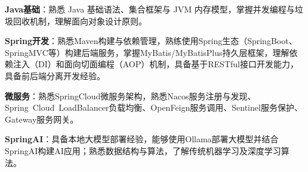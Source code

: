 \item \textbf{Java基础}：熟悉 Java 基础语法、集合框架与 JVM 内存模型，掌握并发编程与垃圾回收机制，理解面向对象设计原则。
\item \textbf{Spring开发}：熟悉Maven构建与依赖管理，熟练使用Spring生态（SpringBoot、SpringMVC等）构建后端服务，掌握MyBatis/MyBatisPlus持久层框架，理解依赖注入（DI）和面向切面编程（AOP）机制，具备基于RESTful接口开发能力，具备前后端分离开发经验。
\item \textbf{微服务}：熟悉SpringCloud微服务架构，熟悉Nacos服务注册与发现、Spring Cloud LoadBalancer负载均衡、OpenFeign服务调用、Sentinel服务保护、Gateway服务网关。
\item \textbf{SpringAI}：具备本地大模型部署经验，能够使用Ollama部署大模型并结合SpringAI构建AI应用；熟悉数据结构与算法，了解传统机器学习及深度学习算法。